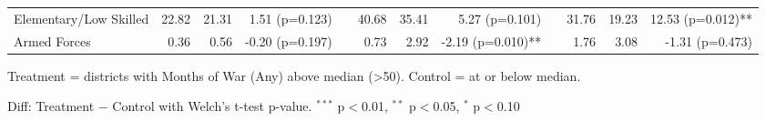 \begin{table}[htbp]
\begin{tabular}{l rrr c rrr c rrr}
\quad Elementary/Low Skilled & 22.82 & 21.31 & 1.51 (p=0.123) &  & 40.68 & 35.41 & 5.27 (p=0.101) &  & 31.76 & 19.23 & 12.53 (p=0.012)** \\
\quad Armed Forces & 0.36 & 0.56 & -0.20 (p=0.197) &  & 0.73 & 2.92 & -2.19 (p=0.010)** &  & 1.76 & 3.08 & -1.31 (p=0.473) \\
\bottomrule
\end{tabular}
\begin{tablenotes}
\small
\item Treatment = districts with Months of War (Any) above median (>50). Control = at or below median.
\item Diff: Treatment $-$ Control with Welch's t-test p-value. $^{{***}}$ p$<$0.01, $^{{**}}$ p$<$0.05, $^{{*}}$ p$<$0.10
\end{tablenotes}
\end{table}

\clearpage

